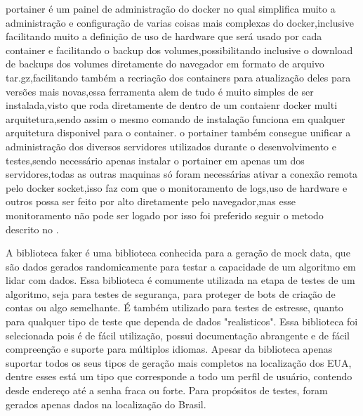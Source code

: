 \documentclass[
	12pt,				%
	openright,			%
	oneside,			%
	a4paper,			%
	english,			%
	french,				%
	spanish,			%
	brazil,				%
	]{abntex2}
\begin{document}
portainer é um painel de administração do docker no qual simplifica muito a administração e configuração de varias coisas mais complexas do docker,inclusive facilitando muito a definição de uso de hardware que será usado por cada container e facilitando o backup dos volumes,possibilitando inclusive o download de backups dos volumes diretamente do navegador em formato de arquivo tar.gz,facilitando também a recriação dos containers para atualização deles para versões mais novas,essa ferramenta alem de tudo é muito simples de ser instalada,visto que roda diretamente de dentro de um contaienr docker multi arquitetura,sendo assim o mesmo comando de instalação funciona em qualquer arquitetura disponivel para o container.
o portainer também consegue unificar a administração dos diversos servidores utilizados durante o desenvolvimento e testes,sendo necessário apenas instalar o portainer em apenas um dos servidores,todas as outras maquinas só foram necessárias ativar a conexão remota pelo docker socket,isso faz com que o monitoramento de logs,uso de hardware e outros possa ser feito por alto diretamente pelo navegador,mas esse monitoramento não pode ser logado por isso foi preferido seguir o metodo descrito no .

A biblioteca faker é uma biblioteca conhecida para a geração de mock data, que são dados gerados randomicamente para testar a capacidade de um algoritmo em lidar com dados. Essa biblioteca é comumente utilizada na etapa de testes de um algoritmo, seja para testes de segurança, para proteger de bots de criação de contas ou algo semelhante. É também utilizado para testes de estresse, quanto para qualquer tipo de teste que dependa de dados "realisticos".\newline
Essa biblioteca foi selecionada pois é de fácil utilização, possui documentação abrangente e de fácil compreenção e suporte para múltiplos idiomas. Apesar da biblioteca apenas suportar todos os seus tipos de geração mais completos na localização dos EUA, dentre esses está um tipo que corresponde a todo um perfil de usuário, contendo desde endereço até a senha fraca ou forte. Para propósitos de testes, foram gerados apenas dados na localização do Brasil.\newline
\end{document}
